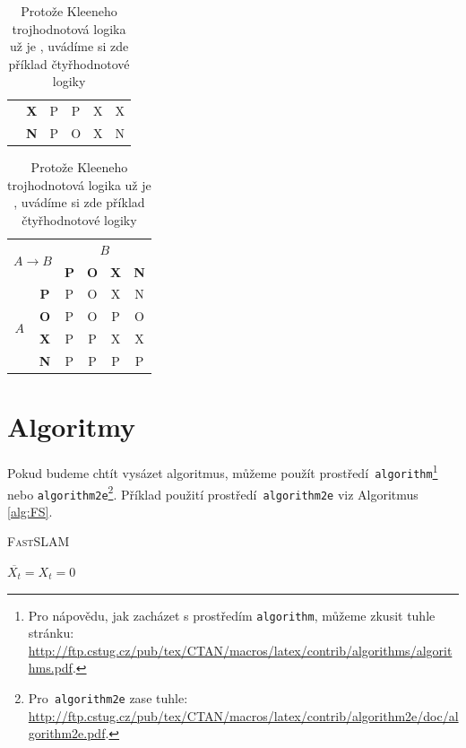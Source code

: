 \documentclass[11pt, a4paper]{article}
\begin{document}
\begin{table}[h]
\begin{tabular}{|c|c|c|c|c|c|}
     & \textbf{X} & P & P & X & X \\ \cline{2-6}
     & \textbf{N} & P & O & X & N \\ \hline
\end{tabular}
\begin{tabular}{|c|c|c|c|c|c|} \hline
     \multicolumn{2}{|c|}{\multirow{2}{*}{$A \rightarrow B$}} & \multicolumn{4}{c|}{$B$} \\ \cline{3-6}
     \multicolumn{2}{|c|}{} & \textbf{P} & \textbf{O} & \textbf{X} & \textbf{N} \\ \hline
     \multirow{4}{*}{$A$} & \textbf{P} & P & O & X & N \\ \cline{2-6}
     & \textbf{O} & P & O & P & O \\ \cline{2-6}
     & \textbf{X} & P & P & X & X \\ \cline{2-6}
     & \textbf{N} & P & P & P & P \\ \hline
\end{tabular}
\caption{Protože Kleeneho trojhodnotová logika už je , uvádíme si zde příklad čtyřhodnotové logiky}
\label{tab:Logika}
\end{table}

\section{Algoritmy}
\label{sec:Algoritmy}
Pokud budeme chtít vysázet algoritmus, můžeme použít prostředí\texttt{ algorithm}\footnote{\raggedright Pro nápovědu, jak zacházet s prostředím \texttt{algorithm}, můžeme zkusit tuhle stránku: \href{http://ftp.cstug.cz/pub/tex/CTAN/macros/latex/contrib/algorithms/algorithms.pdf}{http://ftp.cstug.cz/pub/tex/CTAN/macros/latex/contrib/algorithms/algorithms.pdf}.} nebo \texttt{algorithm2e}\footnote{Pro\texttt{ algorithm2e} zase tuhle: \href{http://ftp.cstug.cz/pub/tex/CTAN/macros/latex/contrib/algorithm2e/doc/algorithm2e.pdf}{http://ftp.cstug.cz/pub/tex/CTAN/macros/latex/contrib/algorithm2e/doc/algorithm2e.pdf}.}. Příklad použití prostředí\texttt{ algorithm2e} viz Algoritmus \ref{alg:FS}.

\IncMargin{1.7em}
\begin{center}
\begin{algorithm}[H]
\caption{\textsc{FastSLAM}}
\label{alg:FS}
\DontPrintSemicolon
\SetAlgoNoLine  %
\SetNlSty{}{}{:}
\Indentp{-1.7em}
\Indentp{1.7em}
\BlankLine
$\overline{X_t} = X_t = 0$ \;
 \;
\Indentp{-1.7em}
\end{algorithm}
\end{center}
\DecMargin{1.7em}
\medskip
\end{document}

